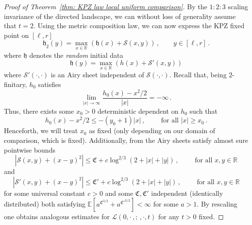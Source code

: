 \documentclass[11pt, reqno]{amsart}
\numberwithin{equation}{section}
\newcommand{\R}{\ensuremath{\mathbb{R}}}
\begin{document}
\begin{proof}[Proof of Theorem~\ref{thm: KPZ law local uniform comparison}]
By the $1:2:3$ scaling invariance of the directed landscape, we can without loss of generality assume that $t = 2$. Using the metric composition law, we can now express the KPZ fixed point on $[\ell, r]$
\begin{equation*}
\mathfrak{h}_2(y) = \displaystyle\max_{x\in \R}(\mathfrak{h}(x)+\mathcal{S}(x,y))\,,\qquad y\in [\ell, r]\,.
\end{equation*}
where $\mathfrak{h}$ denotes the \emph{random} initial data 
\begin{equation*}
\mathfrak{h}(y) = \displaystyle\max_{x\in \R}(h(x)+\mathcal{S}'(x,y))
\end{equation*}
where $\mathcal{S}'(\cdot,\cdot)$ is an Airy sheet independent of $\mathcal{S}(\cdot, \cdot)$. Recall that, being $2$-finitary, $h_0$ satisfies
\begin{equation*}
\displaystyle\lim_{|x|\to \infty}\frac{h_0(x)-x^2/2}{|x|} = -\infty\,.
\end{equation*}
Thus, there exists some $x_0>0$ deterministic dependent on $h_0$ such that
\begin{equation*}
h_0(x)-x^2/2 \le -(y_0+1)|x|\,, \qquad \text{ for all } |x|\ge x_0\,.
\end{equation*}
Henceforth, we will treat $x_0$ as fixed (only depending on our domain of comparison, which is fixed). Additionally, from \cite{dauvergne2022three} the Airy sheets satisfy almost sure pointwise bounds 
\begin{equation*}
|\mathcal{S}(x,y)+(x-y)^2|\le \mathfrak{C}+c\log^{2/3}(2+|x|+|y|)\,,\qquad \text{ for all } x,y\in \R 
\end{equation*}
and 
\begin{equation*}
|\mathcal{S}'(x,y)+(x-y)^2|\le \mathfrak{C}'+c\log^{2/3}(2+|x|+|y|)\,,\qquad \text{ for all } x,y\in \R 
\end{equation*}
for some universal constant $c>0$ and some $\mathfrak{C}, \mathfrak{C}'$ independent (identically distributed) both satisfying $\mathbb{E}[a^{\mathfrak{C}^{3/2}}+a^{\mathfrak{C}'^{3/2}}]<\infty$ for some $a>1$. By rescaling one obtains analogous estimates for $\mathcal{L}(0,\cdot \,,;\,, \cdot, t)$ for any $t>0$ fixed.


\end{proof}
\end{document}
